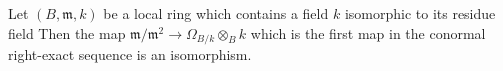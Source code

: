 \begin{theorem}
	[Hartshorne II.8.7]
	\label{thm:regular_implies_conormal_exact}
	Let \((B,\mathfrak{m},k)\) be a local ring 
	which contains a field \(k\) 
	isomorphic to its residue field
	Then the map 
	\(\mathfrak{m} / \mathfrak{m}^{2} \to \Omega_{B / k} \otimes_{B} k\)
	which is the first map in the 
	conormal right-exact sequence
	is an isomorphism.
\end{theorem}


%
%
%
%
%
%
%
%
